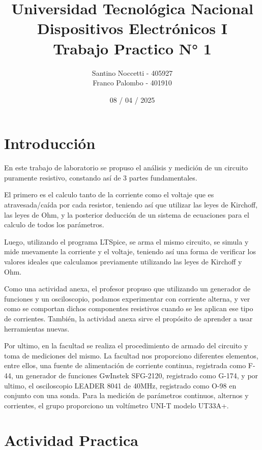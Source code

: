 \documentclass[a4paper,12pt, spanish]{report}
\title{%
\setlength{\headwidth}{\textwidth} %
\setlength{\headheight}{15pt}  %
\setlength{\headsep}{10pt}     %
  \fontsize{25}{0}\selectfont Universidad Tecnológica Nacional \\
  \fontsize{22}{30}\selectfont Dispositivos Electrónicos I \\
  \fontsize{20}{25}\selectfont Trabajo Practico N° 1
}
\author{
  Santino Noccetti - 405927\\
  Franco Palombo - 401910\\
}
\date{08 / 04 / 2025}
\newcommand\myemptypage{
  \newpage
  \null
  \thispagestyle{empty}
  \addtocounter{page}{-1}
  \newpage
}
\begin{document}
  \maketitle

  \myemptypage

  \tableofcontents
  \thispagestyle{plain}

  \myemptypage

  \chapter{Introducción}
    En este trabajo de laboratorio se propuso el análisis y medición de un circuito puramente resistivo, constando así de 3
    partes fundamentales.

    El primero es el calculo tanto de la corriente como el voltaje que es atravesada/caída por cada resistor,
    teniendo así que utilizar las leyes de Kirchoff, las leyes de Ohm, y la posterior deducción de un sistema de
    ecuaciones para el calculo de todos los parámetros.

    Luego, utilizando el programa LTSpice, se arma el mismo circuito, se simula y mide nuevamente la corriente y el
    voltaje, teniendo así una forma de verificar los valores ideales que calculamos previamente utilizando las leyes
    de Kirchoff y Ohm.

    Como una actividad anexa, el profesor propuso que utilizando un generador de funciones y un osciloscopio, podamos
    experimentar con corriente alterna, y ver como se comportan dichos componentes resistivos cuando se les aplican ese
    tipo de corrientes. También, la actividad anexa sirve el propósito de aprender a usar herramientas nuevas.

    Por ultimo, en la facultad se realiza el procedimiento de armado del circuito y toma de mediciones del mismo.
    La facultad nos proporciono diferentes elementos, entre ellos, una fuente de alimentación de corriente continua,
    registrada como F-44, un generador de funciones GwInstek SFG-2120, registrado como G-174, y por ultimo, el
    osciloscopio LEADER 8041 de 40MHz, registrado como O-98 en conjunto con una sonda. Para la medición de parámetros
    continuos, alternos y corrientes, el grupo proporciono un voltímetro UNI-T modelo UT33A+.

  \myemptypage
  \chapter{Actividad Practica}
\end{document}
